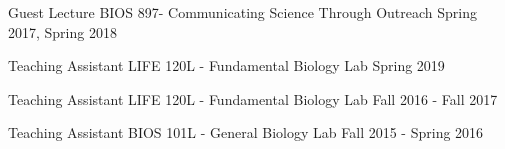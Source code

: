 

\begin{cvoutreaches}

  \cvoutreach
    {Guest Lecture}
    {BIOS 897- Communicating Science Through Outreach}
    {Spring 2017, Spring 2018}
    
  \cvoutreach
    {Teaching Assistant}
    {LIFE 120L - Fundamental Biology Lab}
    {Spring 2019}
  
  \cvoutreach
   {Teaching Assistant}
    {LIFE 120L - Fundamental Biology Lab}
    {Fall 2016 - Fall 2017}
    
  \cvoutreach
    {Teaching Assistant}
    {BIOS 101L - General Biology Lab}
    {Fall 2015 - Spring 2016}
\end{cvoutreaches}
